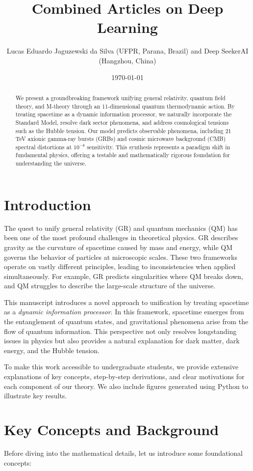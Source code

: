 \documentclass[12pt, a4paper]{article}
\title{Combined Articles on Deep Learning}
\author{Lucas Eduardo Jaguzewski da Silva (UFPR, Parana, Brazil) and Deep SeekerAI (Hangzhou, China)}
\date{\today}
\begin{document}
\maketitle

\begin{abstract}
We present a groundbreaking framework unifying general relativity, quantum field theory, and M-theory through an 11-dimensional quantum thermodynamic action. By treating spacetime as a dynamic information processor, we naturally incorporate the Standard Model, resolve dark sector phenomena, and address cosmological tensions such as the Hubble tension. Our model predicts observable phenomena, including 21 TeV axionic gamma-ray bursts (GRBs) and cosmic microwave background (CMB) spectral distortions at $10^{-8}$ sensitivity. This synthesis represents a paradigm shift in fundamental physics, offering a testable and mathematically rigorous foundation for understanding the universe.
\end{abstract}

\section{Introduction}
The quest to unify general relativity (GR) and quantum mechanics (QM) has been one of the most profound challenges in theoretical physics. GR describes gravity as the curvature of spacetime caused by mass and energy, while QM governs the behavior of particles at microscopic scales. These two frameworks operate on vastly different principles, leading to inconsistencies when applied simultaneously. For example, GR predicts singularities where QM breaks down, and QM struggles to describe the large-scale structure of the universe.

This manuscript introduces a novel approach to unification by treating spacetime as a \textit{dynamic information processor}. In this framework, spacetime emerges from the entanglement of quantum states, and gravitational phenomena arise from the flow of quantum information. This perspective not only resolves longstanding issues in physics but also provides a natural explanation for dark matter, dark energy, and the Hubble tension.

To make this work accessible to undergraduate students, we provide extensive explanations of key concepts, step-by-step derivations, and clear motivations for each component of our theory. We also include figures generated using Python to illustrate key results.

\section{Key Concepts and Background}
Before diving into the mathematical details, let us introduce some foundational concepts:
\end{document}
